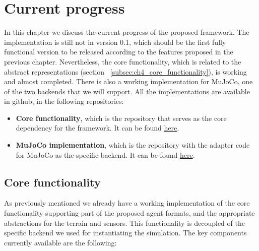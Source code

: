 
\chapter{Current progress}
\label{ch:current_progress}




In this chapter we discuss the current progress of the proposed framework. 
The implementation is still not in version 0.1, which should be the first 
fully functional version to be released according to the features proposed 
in the previous chapter. Nevertheless, the core functionality, which is related
to the abstract representations (section ~\ref{subsec:ch4_core_functionality}),
is working and almost completed. There is also a working implementation for
MuJoCo, one of the two backends that we will support. All the implementations 
are available in github, in the following repositories:

\begin{itemize}
    \item \textbf{Core functionality}, which is the repository that serves as the
          core dependency for the framework. It can be found \href{https://github.com/wpumacay/tysocCore}{here}.
    \item \textbf{MuJoCo implementation}, which is the repository with the
          adapter code for MuJoCo as the specific backend. It can be found
          \href{https://github.com/wpumacay/tysocMjc}{here}.
\end{itemize}

\section{Core functionality}

As previously mentioned we already have a working implementation of the core
functionality supporting part of the proposed agent formats, and the appropriate
abstractions for the terrain and sensors. This functionality is decoupled of the 
specific backend we used for instantiating the simulation. The key components currently 
available are the following:

